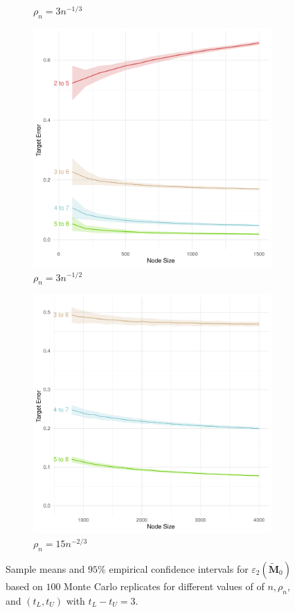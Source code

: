 \documentclass[10pt,journal,compsoc]{IEEEtran}
\numberwithin{equation}{section}
\begin{document}
\begin{figure}
\begin{subfigure}{.23\columnwidth}
\caption{$\rho_n = 3n^{-1/3}$}
\end{subfigure}
\begin{subfigure}{.23\columnwidth}
\includegraphics[width=\columnwidth]{MR_12_3.pdf}%
\caption{$\rho_n = 3n^{-1/2}$}
\end{subfigure}\hfill
\begin{subfigure}{.23\columnwidth}
\includegraphics[width=\columnwidth]{MR_23_3.pdf}%
\caption{$\rho_n = 15n^{-2/3}$}
\end{subfigure}
\caption{Sample means and $95\%$ empirical confidence
    intervals for $\varepsilon_2(\tilde{\mathbf{M}}_0)$ based on $100$
    Monte Carlo replicates for different values of  of $n,\rho_n$, and
    $(t_L, t_U)$ with $t_L - t_U = 3$.}
\label{f:rate:4}
\end{figure}
\end{document}
